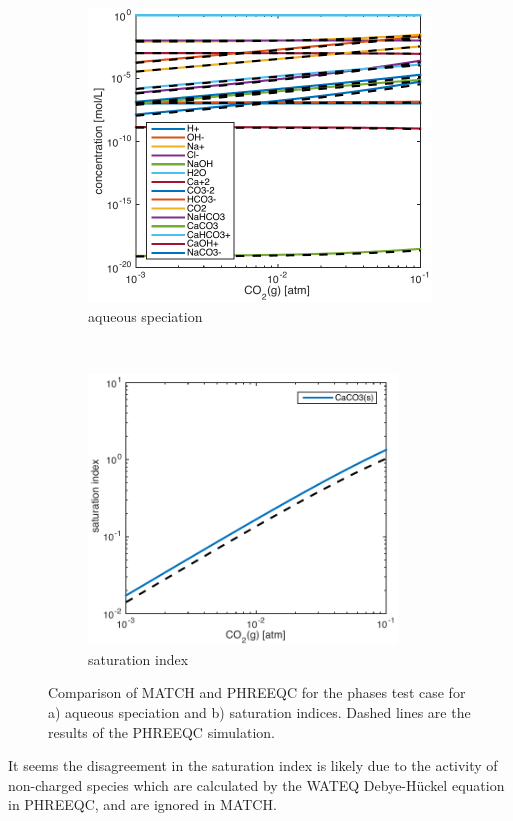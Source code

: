 \documentclass{article}
\begin{document}
\begin{figure}[H]
    \centering
    \begin{subfigure}[t]{0.5\textwidth}
        \centering
        \includegraphics[width=0.9\linewidth]{phases_spec.pdf}
        \caption{aqueous speciation}
    \end{subfigure}%
    ~ 
    \begin{subfigure}[t]{0.5\linewidth}
        \centering
        \includegraphics[width=0.9\textwidth]{phases_si.pdf}
        \caption{saturation index}
    \end{subfigure}
    \caption{Comparison of MATCH and PHREEQC for the phases test case for a) aqueous speciation and b) saturation indices. Dashed lines are the results of the PHREEQC simulation.}
    \label{fig:phases}
\end{figure}
It seems the disagreement in the saturation index is likely due to the activity of non-charged species which are calculated by the WATEQ Debye-H\"{u}ckel equation in PHREEQC, and are ignored in MATCH.
\end{document}
